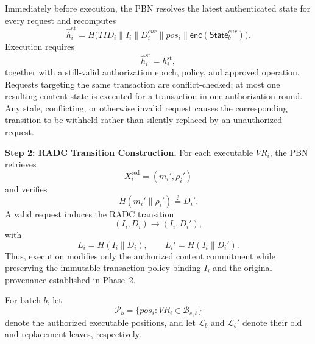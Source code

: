 \documentclass[lettersize,journal]{IEEEtran}
\begin{document}
Immediately before execution, the PBN resolves the latest authenticated
state for every request and recomputes
\begin{equation}
\widehat{h}_i^{\mathrm{st}}
=
H\big(
TID_i\parallel I_i\parallel D_i^{cur}\parallel pos_i
\parallel
\mathsf{enc}(\mathsf{State}_b^{cur})
\big).
\end{equation}
Execution requires
\begin{equation}
\widehat{h}_i^{\mathrm{st}}=h_i^{\mathrm{st}},
\end{equation}
together with a still-valid authorization epoch, policy, and approved
operation. Requests targeting the same transaction are conflict-checked;
at most one resulting content state is executed for a transaction in
one authorization round. Any stale, conflicting, or otherwise invalid
request causes the corresponding transition to be withheld rather than
silently replaced by an unauthorized request.

\medskip
\noindent\textbf{Step 2: RADC Transition Construction.}
For each executable $VR_i$, the PBN retrieves
\begin{equation}
X_i^{\mathrm{red}}=(m_i',\rho_i')
\end{equation}
and verifies
\begin{equation}
H(m_i'\parallel\rho_i')
\stackrel{?}{=}D_i'.
\end{equation}
A valid request induces the RADC transition
\begin{equation}
(I_i,D_i)\longrightarrow(I_i,D_i'),
\end{equation}
with
\begin{equation}
L_i=H(I_i\parallel D_i),
\qquad
L_i'=H(I_i\parallel D_i').
\end{equation}
Thus, execution modifies only the authorized content commitment while
preserving the immutable transaction-policy binding $I_i$ and the
original provenance established in Phase~2.

For batch $b$, let
\begin{equation}
\mathcal{P}_b=
\{pos_i:VR_i\in\mathcal{B}_{e,b}\}
\end{equation}
denote the authorized executable positions, and let
$\mathcal{L}_b$ and $\mathcal{L}_b'$ denote their old and replacement
leaves, respectively.
\end{document}
